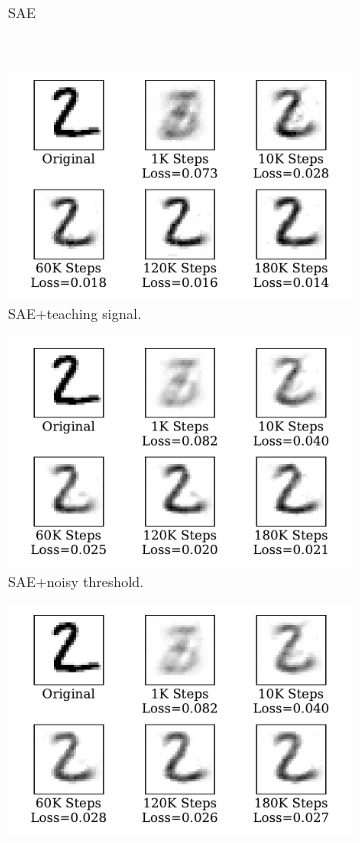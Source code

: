 \begin{figure}
\begin{subfigure}[t]{0.32\textwidth}
		\caption{SAE}
	\end{subfigure}\\
	\begin{subfigure}[t]{0.32\textwidth}
		\includegraphics[width=\textwidth]{pics_sdlm/41_MNIST_SAE_teach/recon_digit.pdf}
		\caption{SAE+teaching signal.}
	\end{subfigure}
	\begin{subfigure}[t]{0.32\textwidth}
		\includegraphics[width=\textwidth]{pics_sdlm/42_MNIST_SAE_noise/recon_digit.pdf}
		\caption{SAE+noisy threshold.}
	\end{subfigure}
	\begin{subfigure}[t]{0.32\textwidth}
		\includegraphics[width=\textwidth]{pics_sdlm/43_MNIST_SAE_all/recon_digit.pdf}

\end{subfigure}
\end{figure}
